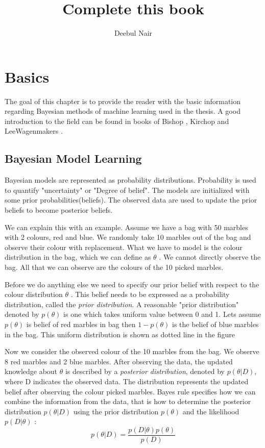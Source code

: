 \documentclass[11pt]{book}
\title{\textbf{Complete this book }}
\author{Deebul Nair}
\date{}
\begin{document}
\maketitle
\chapter{Basics}

The goal of this chapter is to provide the reader with the basic information regarding Bayesian methods of machine learning used in the thesis. A good introduction to the field can be found in books of Bishop \cite{}, Kirchop \cite{} and LeeWagenmakers \cite{} . 

\section{Bayesian Model Learning}

Bayesian models are represented as probability distributions. Probability is used to quantify "uncertainty" or "Degree of belief". The models are initialized with some prior probabilities(beliefs). The observed data are used to update the prior beliefs to become posterior beliefs.

We can explain this with an example. Assume we have a bag with 50 marbles with 2 colours, red and blue. We randomly take 10 marbles out of the bag and observe their colour with replacement. What we have to model is the colour distribution in the bag, which we can define as $\theta$ . We cannot directly observe the bag. All that we can observe are the colours of the 10 picked marbles.

Before we do anything else we need to specify our prior belief with respect to the colour distribution $\theta$ . This belief needs to be expressed as a probability distribution, called the \emph{prior distribution}. A reasonable "prior distribution" denoted by $p(\theta)$ is one which takes uniform value between 0 and 1. Lets assume $p(\theta)$ is belief of red marbles in bag then $1 - p(\theta)$  is the belief of blue marbles in the bag. This uniform distribution is shown as dotted line in the figure 

Now we consider the observed colour of the 10 marbles from the bag. We observe 8 red marbles and 2 blue marbles. After observing the data, the updated knowledge about $\theta$ is described by a \emph{posterior distribution}, denoted by $p(\theta | D)$, where D indicates the observed data. The distribution represents the updated belief after observing the colour picked marbles. Bayes rule specifies how we can combine the information from the data, that is how to determine the posterior distribution $p (\theta | D)$ using  the prior distribution $p(\theta)$ and the likelihood  $p (D | \theta)$ :
\begin{equation}
	p(\theta | D) = \frac{p(D | \theta) p(\theta)}{p(D)}
\end{equation}
\end{document}

